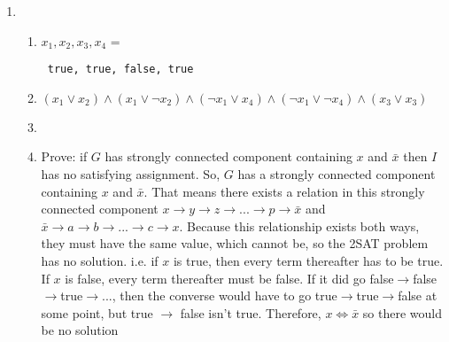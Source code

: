 \documentclass[11pt]{article}
\begin{document}
\begin{enumerate}
\begin{enumerate}
\end{enumerate}
\newpage
\item
\begin{enumerate}
\item $x_1,x_2,x_3,x_4$ = \begin{verbatim} true, true, false, true \end{verbatim}
\item $(x_1\vee x_2)\wedge (x_1\vee\neg x_2)\wedge (\neg x_1 \vee x_4)\wedge (\neg x_1\vee \neg x_4)\wedge (x_3 \vee x_3)$
\item
{}\\
\item Prove: if $G$ has strongly connected component containing $x$ and $\bar{x}$ then $I$ has no satisfying assignment. So, $G$ has a strongly connected component containing $x$ and $\bar{x}$. That means there exists a relation in this strongly connected component $x\to y \to z \to ...  \to p \to \bar{x}$ and $\bar{x}\to a \to b \to ... \to c \to x$. Because this relationship exists both ways, they must have the same value, which cannot be, so the 2SAT problem has no solution. i.e. if $x$ is true, then every term thereafter has to be true. If $x$ is false, every term thereafter must be false. If it did go false$\to$false$\to$true$\to$..., then the converse would have to go true$\to$true$\to$false at some point, but true $\to$ false isn't true. Therefore, $x\iff \bar{x}$ so there would be no solution

\end{enumerate}
\end{enumerate}
\end{document}
